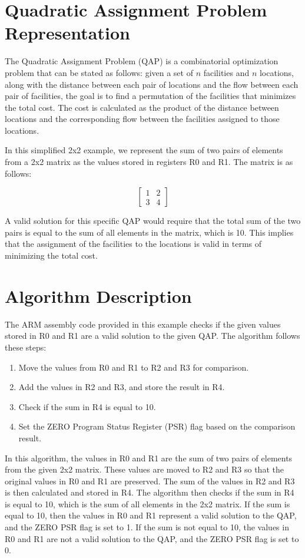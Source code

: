 \section{Quadratic Assignment Problem Representation}

The Quadratic Assignment Problem (QAP) is a combinatorial optimization problem that can be stated as follows: given a set of $n$ facilities and $n$ locations, along with the distance between each pair of locations and the flow between each pair of facilities, the goal is to find a permutation of the facilities that minimizes the total cost. The cost is calculated as the product of the distance between locations and the corresponding flow between the facilities assigned to those locations. 

In this simplified 2x2 example, we represent the sum of two pairs of elements from a 2x2 matrix as the values stored in registers R0 and R1. The matrix is as follows:

\[
\begin{bmatrix}
1 & 2 \\
3 & 4
\end{bmatrix}
\]

A valid solution for this specific QAP would require that the total sum of the two pairs is equal to the sum of all elements in the matrix, which is 10. This implies that the assignment of the facilities to the locations is valid in terms of minimizing the total cost.

\section{Algorithm Description}

The ARM assembly code provided in this example checks if the given values stored in R0 and R1 are a valid solution to the given QAP. The algorithm follows these steps:

\begin{enumerate}
\item Move the values from R0 and R1 to R2 and R3 for comparison.
\item Add the values in R2 and R3, and store the result in R4.
\item Check if the sum in R4 is equal to 10.
\item Set the ZERO Program Status Register (PSR) flag based on the comparison result.
\end{enumerate}

In this algorithm, the values in R0 and R1 are the sum of two pairs of elements from the given 2x2 matrix. These values are moved to R2 and R3 so that the original values in R0 and R1 are preserved. The sum of the values in R2 and R3 is then calculated and stored in R4. The algorithm then checks if the sum in R4 is equal to 10, which is the sum of all elements in the 2x2 matrix. If the sum is equal to 10, then the values in R0 and R1 represent a valid solution to the QAP, and the ZERO PSR flag is set to 1. If the sum is not equal to 10, the values in R0 and R1 are not a valid solution to the QAP, and the ZERO PSR flag is set to 0.

